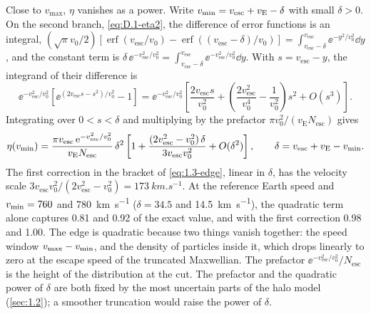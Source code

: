Close to $v_{\mathrm{max}}$, $\eta$ vanishes as a power. Write $v_{\mathrm{min}} = v_{\mathrm{esc}} + v_{\mathrm{E}} - \delta$ with small $\delta > 0$. On the second branch, \cref{eq:D.1-eta2}, the difference of error functions is an integral, $(\sqrt{\pi}v_0/2)[\operatorname{erf}(v_{\mathrm{esc}}/v_0) - \operatorname{erf}((v_{\mathrm{esc}} - \delta)/v_0)] = \int_{v_{\mathrm{esc}} - \delta}^{v_{\mathrm{esc}}}\ee^{-y^2/v_0^2}\dd y$, and the constant term is $\delta\,\ee^{-v_{\mathrm{esc}}^2/v_0^2} = \int_{v_{\mathrm{esc}} - \delta}^{v_{\mathrm{esc}}}\ee^{-v_{\mathrm{esc}}^2/v_0^2}\dd y$. With $s = v_{\mathrm{esc}} - y$, the integrand of their difference is
\begin{equation*}
  \ee^{-v_{\mathrm{esc}}^2/v_0^2}\left[\ee^{(2v_{\mathrm{esc}}s - s^2)/v_0^2} - 1\right]
  = \ee^{-v_{\mathrm{esc}}^2/v_0^2}\left[\frac{2v_{\mathrm{esc}}s}{v_0^2} + \left(\frac{2v_{\mathrm{esc}}^2}{v_0^4} - \frac{1}{v_0^2}\right)s^2 + O(s^3)\right].
\end{equation*}
Integrating over $0 < s < \delta$ and multiplying by the prefactor $\pi v_0^2/(v_{\mathrm{E}}N_{\mathrm{esc}})$ gives
\begin{equation}
  \eta(v_{\mathrm{min}}) = \frac{\pi v_{\mathrm{esc}}\,\mathrm{e}^{-v_{\mathrm{esc}}^2/v_0^2}}{v_{\mathrm{E}}N_{\mathrm{esc}}}\,\delta^2\left[1 + \frac{(2v_{\mathrm{esc}}^2 - v_0^2)\,\delta}{3v_{\mathrm{esc}}v_0^2} + O(\delta^2)\right],
  \qquad \delta = v_{\mathrm{esc}} + v_{\mathrm{E}} - v_{\mathrm{min}} .
  \label{eq:1.3-edge}
\end{equation}
The first correction in the bracket of \cref{eq:1.3-edge}, linear in $\delta$, has the velocity scale $3v_{\mathrm{esc}}v_0^2/(2v_{\mathrm{esc}}^2 - v_0^2) = \SI{173}{km.s^{-1}}$. At the reference Earth speed and $v_{\mathrm{min}} = 760$ and \SI{780}{km.s^{-1}} ($\delta = 34.5$ and \SI{14.5}{km.s^{-1}}), the quadratic term alone captures 0.81 and 0.92 of the exact value, and with the first correction 0.98 and 1.00. The edge is quadratic because two things vanish together: the speed window $v_{\mathrm{max}} - v_{\mathrm{min}}$, and the density of particles inside it, which drops linearly to zero at the escape speed of the truncated Maxwellian. The prefactor $\ee^{-v_{\mathrm{esc}}^2/v_0^2}/N_{\mathrm{esc}}$ is the height of the distribution at the cut. The prefactor and the quadratic power of $\delta$ are both fixed by the most uncertain parts of the halo model (\cref{sec:1.2}); a smoother truncation would raise the power of $\delta$.

